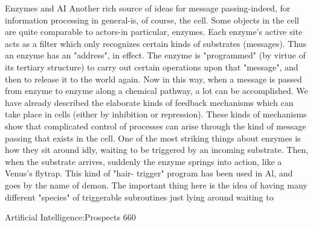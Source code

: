                                     Enzymes and AI
Another rich source of ideas for message passing-indeed, for information processing in
general-is, of course, the cell. Some objects in the cell are quite comparable to actors-in
particular, enzymes. Each enzyme's active site acts as a filter which only recognizes
certain kinds of substrates (messages). Thus an enzyme has an "address", in effect. The
enzyme is "programmed" (by virtue of its tertiary structure) to carry out certain
operations upon that "message", and then to release it to the world again. Now in this
way, when a message is passed from enzyme to enzyme along a chemical pathway, a lot
can be accomplished. We have already described the elaborate kinds of feedback
mechanisms which can take place in cells (either by inhibition or repression). These kinds
of mechanisms show that complicated control of processes can arise through the kind of
message passing that exists in the cell.
        One of the most striking things about enzymes is how they sit around idly,
waiting to be triggered by an incoming substrate. Then, when the substrate arrives,
suddenly the enzyme springs into action, like a Venus's flytrap. This kind of "hair-
trigger" program has been used in Al, and goes by the name of demon. The important
thing here is the idea of having many different "species" of triggerable subroutines just
lying around waiting to




Artificial Intelligence:Prospects                                                      660

